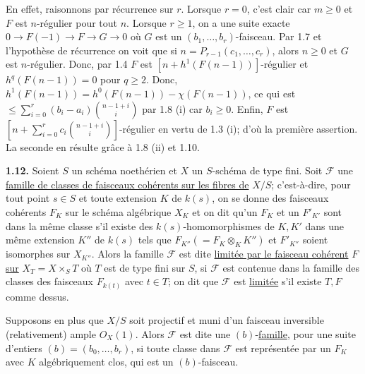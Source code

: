 
En
effet, raisonnons par récurrence sur \(r\). Lorsque \(r=0\), c'est clair car \(m\ge0\) et \(F\) est \(n\)-régulier pour tout \(n\). Lorsque \(r\ge1\), on a une suite exacte $0\longrightarrow F(-1)\longrightarrow F\longrightarrow G\longrightarrow0$ où \(G\) est un \((b_1,\ldots,b_r)\)-faisceau. Par 1.7 et l'hypothèse de récurrence on voit que si \(n=P_{r-1}(c_1,\ldots,c_r)\), alors \(n\ge0\) et \(G\) est \(n\)-régulier. Donc, par 1.4 \(F\) est \([n+h^1(F(n-1))]\)-régulier et \(h^q(F(n-1))=0\) pour \(q\ge2\). Donc, \(h^1(F(n-1))=h^0(F(n-1))-\chi(F(n-1))\), ce qui est \(\le \sum_{i=0}^{r}(b_i-a_i)\binom{n-1+i}{i}\) par 1.8 (i) car \(b_i\ge0\). Enfin, \(F\) est \(\left[n+\sum_{i=0}^{r}c_i\binom{n-1+i}{i}\right]\)-régulier en vertu de 1.3 (i); d'où la première assertion. La seconde en résulte grâce à 1.8 (ii) et 1.10.

\textbf{1.12.} Soient \(S\) un schéma noethérien et \(X\) un \(S\)-schéma de type fini. Soit \(\mathcal F\) une \uline{famille de classes de faisceaux cohérents sur les fibres de} \(X/S\); c'est-à-dire, pour tout point \(s\in S\) et toute extension \(K\) de \(k(s)\), on se donne des faisceaux cohérents \(F_K\) sur le schéma algébrique \(X_K\) et on dit qu'un \(F_K\) et un \(F'_{K'}\) sont dans la même classe s'il existe des \(k(s)\)-homomorphismes de \(K,K'\) dans une même extension \(K''\) de \(k(s)\) tels que \(F_{K''}(=F_K\otimes_K K'')\) et \(F'_{K''}\) soient isomorphes sur \(X_{K''}\). Alors la famille \(\mathcal F\) est dite \uline{limitée par le faisceau cohérent} \(F\) \uline{sur} \(X_T=X\times_S T\) où \(T\) est de type fini sur \(S\), si \(\mathcal F\) est contenue dans la famille des classes des faisceaux \(F_{k(t)}\) avec \(t\in T\); on dit que \(\mathcal F\) est \uline{limitée} s'il existe \(T,F\) comme dessus.

Supposons en plus que \(X/S\) soit projectif et muni d'un faisceau inversible (relativement) ample \({O}_X(1)\). Alors \(\mathcal F\) est dite une \((b)\)-\uline{famille}, pour une suite d'entiers \((b)=(b_0,\ldots,b_r)\), si toute classe dans \(\mathcal F\) est représentée par un \(F_K\) avec \(K\) algébriquement clos, qui est un \((b)\)-faisceau.

